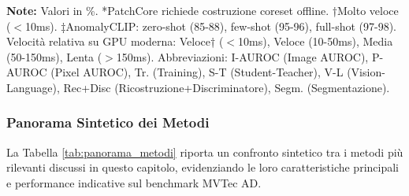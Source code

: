 \begin{table}[h]
\centering
\caption{Confronto sintetico dei principali metodi (valori indicativi su MVTec AD)}
\label{tab:panorama_metodi}
\vspace{5mm}
\parbox{\linewidth}{
    \scriptsize 
    \textbf{Note:} Valori in \%. *PatchCore richiede costruzione coreset offline. †Molto veloce ($<$10ms). ‡AnomalyCLIP: zero-shot (85-88), few-shot (95-96), full-shot (97-98). Velocità relativa su GPU moderna: Veloce† ($<$10ms), Veloce (10-50ms), Media (50-150ms), Lenta ($>$150ms). Abbreviazioni: I-AUROC (Image AUROC), P-AUROC (Pixel AUROC), Tr. (Training), S-T (Student-Teacher), V-L (Vision-Language), Rec+Disc (Ricostruzione+Discriminatore), Segm. (Segmentazione).
}
\end{table}


\subsubsection{Panorama Sintetico dei Metodi}
La Tabella \ref{tab:panorama_metodi} riporta un confronto sintetico tra i metodi più rilevanti discussi in questo capitolo, evidenziando le loro caratteristiche principali e performance indicative sul benchmark MVTec AD.


